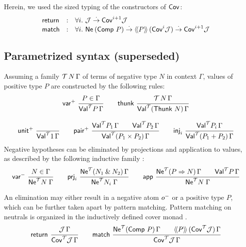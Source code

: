 \documentclass[a4paper,USenglish,cleveref, autoref]{lipics-v2019}
\begin{document}
Herein, we used the sized typing of the constructors of $\Cov$:
\[
\begin{array}{lll}
  \treturn & : & \forall i.\ \J \todot \Cov[i+1] \J \\
  \tmatch  & : & \forall i.\
    \tNe\,(\Comp\,P) \todot \Add P\,(\Cov[i]\J) \todot \Cov[i+1]\J \\
\end{array}
\]




\clearpage

\subsection{Parametrized syntax (superseded)}

Assuming a family $\T\,N\,\Gamma$ of terms of negative type $N$ in
context $\Gamma$, values \fbox{$v : \PValT P \Gamma$}
of positive type $P$ are constructed by the
following rules:
\begin{gather*}
  \nru{\pvar}{P \in \Gamma}{\PValT P \Gamma}
\qquad
  \nru{\tthunk}{\T\,N\,\Gamma}{\PValTP{\Thunk\,N}\Gamma}
\\[2ex]
  \nru{\punit}{}{\PValT{\tyone}\Gamma}
\qquad
  \nru{\ppair}
      {\PValT{P_1}\Gamma \qquad \PValT{P_2}\Gamma}
      {\PValTP{P_1 \times P_2}\Gamma}
\qquad
  \nru{\tinj_i}{\PValT{P_i}\Gamma}{\PValTP{P_1 + P_2}\Gamma}
\end{gather*}
Negative hypotheses can be eliminated by projections and application
to values, as described by the following inductive family
:
\begin{gather*}
  \nru{\nvar}{N \in \Gamma}{\NeT N \Gamma}
\qquad
  \nru{\tprj_i}
      {\NeTP {N_1 \ntimes N_2} \Gamma}
      {\NeT {N_i} \Gamma}
\qquad
  \nru{\tapp}
      {\NeTP {P \To N} \Gamma \qquad \PValT P \Gamma}
      {\NeT N \Gamma}
\end{gather*}

An elimination may either result in a negative atom $\natom$ or a
positive type $P$, which can be further taken apart by pattern
matching.  Pattern matching on neutrals is organized in the
inductively defined cover monad \fbox{$\Cov[\T]$}.
\begin{gather*}
  \nru{\treturn}{\J\,\Gamma}{\CoverT \J \Gamma}
\qquad
  \nru{\tmatch}
      {\NeTP {\Comp\,P} \Gamma \qquad \AddHypP P {\Cov[\T]\J} \Gamma}
      {\CoverT \J \Gamma}
\end{gather*}
\end{document}
